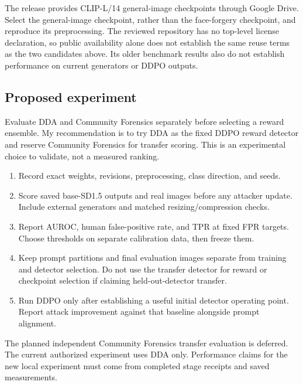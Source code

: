 The release provides CLIP-L/14 general-image checkpoints through Google
Drive. Select the general-image checkpoint, rather than the face-forgery
checkpoint, and reproduce its preprocessing. The reviewed repository has
no top-level license declaration, so public availability alone does not
establish the same reuse terms as the two candidates above. Its older
benchmark results also do not establish performance on current
generators or DDPO outputs.

\subsection{Proposed
experiment}\label{record-docs-image-defenders-md-proposed-experiment}

Evaluate DDA and Community Forensics separately before selecting a
reward ensemble. My recommendation is to try DDA as the fixed DDPO
reward detector and reserve Community Forensics for transfer scoring.
This is an experimental choice to validate, not a measured ranking.

\begin{enumerate}
\def\labelenumi{\arabic{enumi}.}
\tightlist
\item
  Record exact weights, revisions, preprocessing, class direction, and
  seeds.
\item
  Score saved base-SD1.5 outputs and real images before any attacker
  update. Include external generators and matched resizing/compression
  checks.
\item
  Report AUROC, human false-positive rate, and TPR at fixed FPR targets.
  Choose thresholds on separate calibration data, then freeze them.
\item
  Keep prompt partitions and final evaluation images separate from
  training and detector selection. Do not use the transfer detector for
  reward or checkpoint selection if claiming held-out-detector transfer.
\item
  Run DDPO only after establishing a useful initial detector operating
  point. Report attack improvement against that baseline alongside
  prompt alignment.
\end{enumerate}

The planned independent Community Forensics transfer evaluation is
deferred. The current authorized experiment uses DDA only. Performance
claims for the new local experiment must come from completed stage
receipts and saved measurements.

